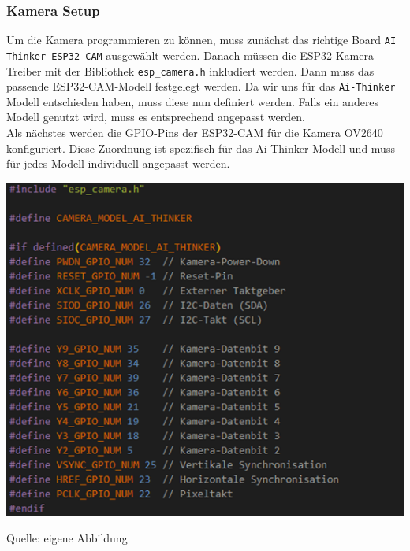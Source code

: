 \documentclass[ngerman,12pt,a4paper]{article}
\begin{document}
			\subsubsection{Kamera Setup}
			
	Um die Kamera programmieren zu können, muss zunächst das richtige Board \texttt{AI Thinker ESP32-CAM} ausgewählt werden. Danach müssen die ESP32-Kamera-Treiber mit der Bibliothek \texttt{esp\_camera.h} inkludiert werden. Dann muss das passende ESP32-CAM-Modell festgelegt werden. Da wir uns für das \texttt{Ai-Thinker} Modell entschieden haben, muss diese nun definiert werden. Falls ein anderes Modell genutzt wird, muss es entsprechend angepasst werden. \\[0.5cm]
	Als nächstes werden die GPIO-Pins der ESP32-CAM für die Kamera OV2640 konfiguriert. Diese Zuordnung ist spezifisch für das Ai-Thinker-Modell und muss für jedes Modell individuell angepasst werden. \\[0.5cm]
	\begin{center}
		\begin{minipage}[t]{0.95\textwidth}
			\includegraphics{Pictures/kamera-setup1}
			\label{fig:Kamera-GPIO Konfiguration}
			\vspace{-10pt}
			\begin{center}
				\par\small Quelle: eigene Abbildung 
			\end{center}
		\end{minipage} \\[0.75cm]
	\end{center}
\end{document}
